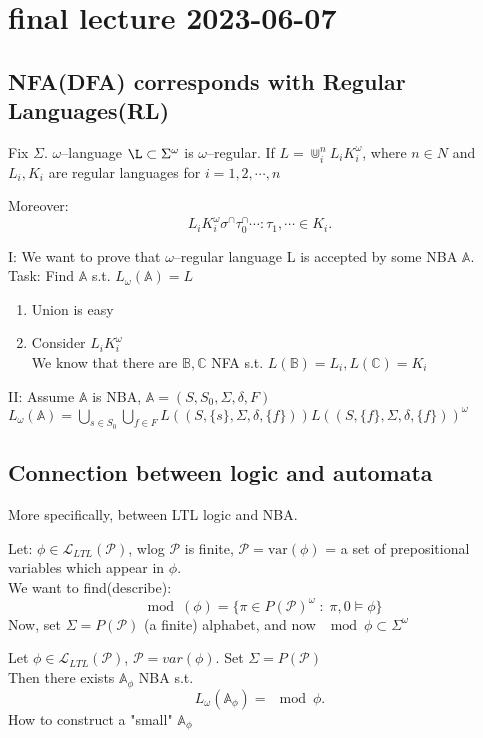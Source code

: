 
\chapter{final lecture 2023-06-07}
\section{NFA(DFA) corresponds with Regular Languages(RL)}
\dfn{}
{
    Fix $\Sigma$.  $\omega$--language  $\L \subset \Sigma^{\omega}$ is $\omega$--regular.
    If  $L = \Cup^{n}_i L_i K_i^{\omega}$, where $n \in N$ and  $L_i, K_i$ are regular languages for  $i = 1,2,\cdots ,n$

    Moreover:
    \[
        L_iK_i^{\omega}{\sigma^{\cap}\tau_0^{\cap}\cdots : \tau_1,\cdots \in K_i}
    .\] 
}
{
    \begin{myproof}
        I: We want to prove that $\omega$--regular language L is accepted by some NBA  $\mathbb{A}$.\\
            Task: Find $\mathbb{A}$ s.t. $L_\omega(\mathbb{A}) = L$\\
            \begin{enumerate}
                \item Union is easy\\
                \item Consider $L_iK_i^{\omega}$ \\
                    We know that there are $\mathbb{B}, \mathbb{C}$ NFA s.t. $L(\mathbb{B}) = L_i, L(\mathbb{C})=K_i$
            \end{enumerate}
       II: Assume $\mathbb{A}$ is NBA, $\mathbb{A} = (S,S_0,\Sigma,\delta,F)$ \\
       $L_\omega(\mathbb{A}) = \bigcup_{s\in S_0}\bigcup_{f\in F} L((S,\{s\},\Sigma,\delta,\{f\}))L((S,\{f\},\Sigma,\delta,\{f\}))^{\omega}$
    \end{myproof}
}

\section{Connection between logic and automata}
More specifically, between LTL logic and NBA.
\begin{myproof}
    Let: $ \phi \in \mathcal{L}_{LTL}(\mathcal{P})$, wlog $\mathcal{P}$ is finite, $\mathcal{P} = \text{var}(\phi)$ = a set of prepositional variables which appear in $\phi $.\\
    We want to find(describe):
    \begin{equation}
        \mod(\phi ) = \{ \pi \in P(\mathcal{P})^{\omega} \;:\; \pi,0 \vDash \phi\}
    \end{equation}
    Now, set $\Sigma = P(\mathcal{P})$ (a finite) alphabet, and now  $\mod{\phi } \subset \Sigma^{\omega}$
\end{myproof}
\thm{}
{
    Let $\phi \in \mathcal{L}_{LTL}(\mathcal{P})$, $\mathcal{P} = var(\phi )$. Set $\Sigma = P(\mathcal{P})$\\
    Then there exists $\mathbb{A}_\phi$ NBA s.t.\\
     \[
         L_\omega(\mathbb{A}_\phi) = \mod{\phi}
    .\] 
}
\qs{}
{How to construct a "small" $\mathbb{A}_\phi$}

